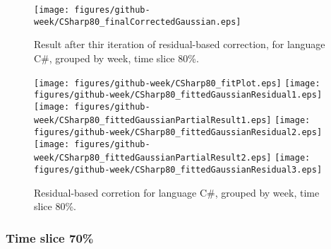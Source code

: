\begin{figure}[]
\centering
{\texttt{[image: figures/github-week/CSharp80\_finalCorrectedGaussian.eps]}}
\caption{Result after thir iteration of residual-based correction, for language C\#, grouped by week, time slice 80\%.}
\end{figure}


\begin{figure}[hb]
\centering
{}
{\texttt{[image: figures/github-week/CSharp80\_fitPlot.eps]}}
{\texttt{[image: figures/github-week/CSharp80\_fittedGaussianResidual1.eps]}}
{\texttt{[image: figures/github-week/CSharp80\_fittedGaussianPartialResult1.eps]}}
{\texttt{[image: figures/github-week/CSharp80\_fittedGaussianResidual2.eps]}}
{\texttt{[image: figures/github-week/CSharp80\_fittedGaussianPartialResult2.eps]}}
{\texttt{[image: figures/github-week/CSharp80\_fittedGaussianResidual3.eps]}}
\caption{Residual-based corretion for language C\#, grouped by week, time slice 80\%.}
\end{figure}


\clearpage 
\newpage 


\FloatBarrier

\subsubsection{Time slice 70\%}

